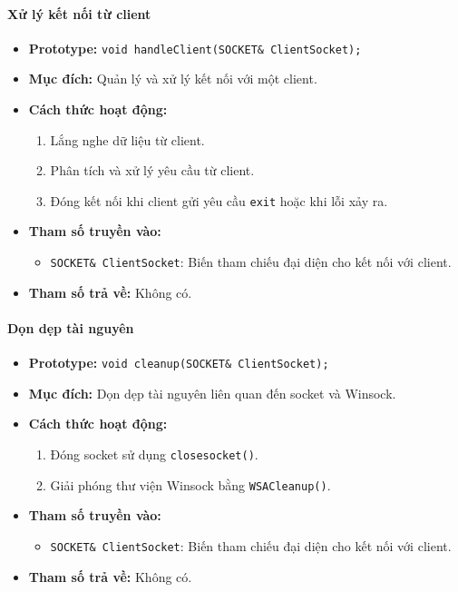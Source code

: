 \paragraph{\textbf{Xử lý kết nối từ client}}
\begin{itemize}
    \item \textbf{Prototype:} \texttt{void handleClient(SOCKET\& ClientSocket);}
    
    \item \textbf{Mục đích:} Quản lý và xử lý kết nối với một client.
    
    \item \textbf{Cách thức hoạt động:} 
    \begin{enumerate}
        \item Lắng nghe dữ liệu từ client.
        \item Phân tích và xử lý yêu cầu từ client.
        \item Đóng kết nối khi client gửi yêu cầu \texttt{exit} hoặc khi lỗi xảy ra.
    \end{enumerate}
    
    \item \textbf{Tham số truyền vào:} 
    \begin{itemize}
        \item \texttt{SOCKET\& ClientSocket}: Biến tham chiếu đại diện cho kết nối với client.
    \end{itemize}
    
    \item \textbf{Tham số trả về:} Không có.
\end{itemize}

\paragraph{\textbf{Dọn dẹp tài nguyên}}
\begin{itemize}
    \item \textbf{Prototype:} \texttt{void cleanup(SOCKET\& ClientSocket);}
    
    \item \textbf{Mục đích:} Dọn dẹp tài nguyên liên quan đến socket và Winsock.
    
    \item \textbf{Cách thức hoạt động:} 
    \begin{enumerate}
        \item Đóng socket sử dụng \texttt{closesocket()}.
        \item Giải phóng thư viện Winsock bằng \texttt{WSACleanup()}.
    \end{enumerate}
    
    \item \textbf{Tham số truyền vào:} 
    \begin{itemize}
        \item \texttt{SOCKET\& ClientSocket}: Biến tham chiếu đại diện cho kết nối với client.
    \end{itemize}
    \item \textbf{Tham số trả về:} Không có.
\end{itemize}

